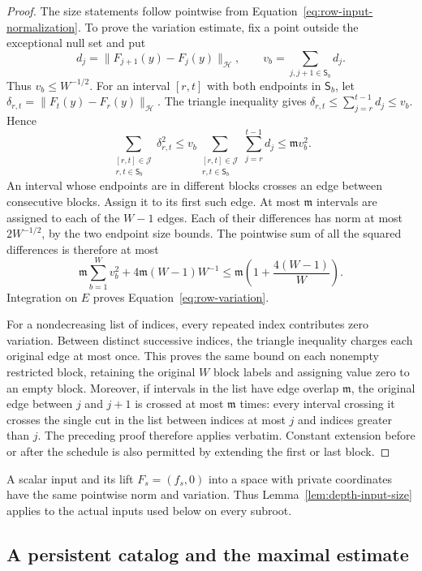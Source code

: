 \begin{proof}
The size statements follow pointwise from
Equation~\eqref{eq:row-input-normalization}.  To prove the variation
estimate, fix a point outside the exceptional null set and put
\[
 d_j=\|F_{j+1}(y)-F_j(y)\|_{\mathcal H},
 \qquad
 v_b=\sum_{j,j+1\in\mathsf S_b}d_j.
\]
Thus $v_b\le W^{-1/2}$.  For an interval $[r,t]$ with both endpoints in
$\mathsf S_b$, let $\delta_{r,t}=\|F_t(y)-F_r(y)\|_{\mathcal H}$.
The triangle inequality gives
$\delta_{r,t}\le\sum_{j=r}^{t-1}d_j\le v_b$.  Hence
\[
 \sum_{\substack{[r,t]\in\mathcal J\\r,t\in\mathsf S_b}}
       \delta_{r,t}^2
 \le v_b
       \sum_{\substack{[r,t]\in\mathcal J\\r,t\in\mathsf S_b}}
          \sum_{j=r}^{t-1}d_j
 \le \mathfrak m v_b^2.
\]
An interval whose endpoints are in different blocks crosses an edge
between consecutive blocks.  Assign it to its first such edge.  At most
$\mathfrak m$ intervals are assigned to each of the $W-1$ edges.  Each
of their differences has norm at most $2W^{-1/2}$, by the two endpoint
size bounds.  The pointwise sum of all the squared differences is
therefore at most
\[
 \mathfrak m\sum_{b=1}^Wv_b^2+
       4\mathfrak m(W-1)W^{-1}
 \le \mathfrak m\left(1+\frac{4(W-1)}W\right).
\]
Integration on $E$ proves Equation~\eqref{eq:row-variation}.

For a nondecreasing list of indices, every repeated index contributes
zero variation.  Between distinct successive indices, the triangle
inequality charges each original edge at most once.  This proves the
same bound on each nonempty restricted block, retaining the original
$W$ block labels and assigning value zero to an empty block.  Moreover, if
intervals in the list have edge overlap $\mathfrak m$, the original
edge between $j$ and $j+1$ is crossed at most $\mathfrak m$ times:
every interval crossing it crosses the single cut in the list between
indices at most $j$ and indices greater than $j$.  The preceding proof
therefore applies verbatim.  Constant extension before or after the
schedule is also permitted by extending the first or last block.
\end{proof}

A scalar input and its lift $F_s=(f_s,0)$ into a space with private
coordinates have the same pointwise norm and variation.  Thus
Lemma~\ref{lem:depth-input-size} applies to the actual inputs used below on
every subroot.

\subsection{A persistent catalog and the maximal estimate}

